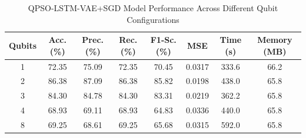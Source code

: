 
\begin{table}[htbp]
\centering
\caption{QPSO-LSTM-VAE+SGD Model Performance Across Different Qubit Configurations}
\label{tab:qubit_ablation}
\begin{tabular}{|c|c|c|c|c|c|c|c|}
\hline
\textbf{Qubits} & \textbf{Acc. (\%)} & \textbf{Prec. (\%)} & \textbf{Rec. (\%)} & \textbf{F1-Sc. (\%)} & \textbf{MSE} & \textbf{Time (s)} & \textbf{Memory (MB)} \\
\hline
1 & 72.35 & 75.09 & 72.35 & 70.45 & 0.0317 & 333.6 & 66.2 \\
2 & 86.38 & 87.09 & 86.38 & 85.82 & 0.0198 & 438.0 & 65.8 \\
3 & 84.30 & 84.78 & 84.30 & 83.31 & 0.0219 & 362.2 & 65.8 \\
4 & 68.93 & 69.11 & 68.93 & 64.83 & 0.0336 & 440.0 & 65.8 \\
8 & 69.25 & 68.61 & 69.25 & 65.68 & 0.0315 & 592.0 & 65.8 \\
\hline
\end{tabular}
\end{table}
